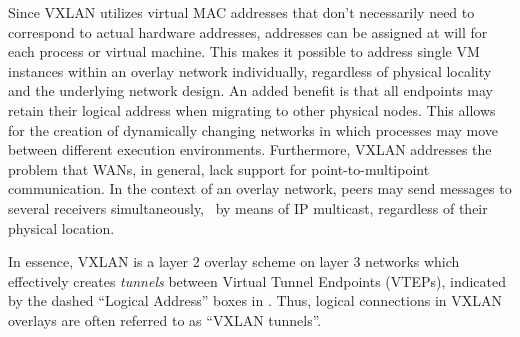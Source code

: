 Since VXLAN utilizes virtual MAC addresses that don't necessarily need to correspond to actual hardware addresses, addresses can be assigned at will for each process or virtual machine. This makes it possible to address single VM instances within an overlay network individually, regardless of physical locality and the underlying network design. An added benefit is that all endpoints may retain their logical address when migrating to other physical nodes. This allows for the creation of dynamically changing networks in which processes may move between different execution environments. Furthermore, VXLAN addresses the problem that WANs, in general, lack support for point-to-multipoint communication. In the context of an overlay network, peers may send messages to several receivers simultaneously, \eg\ by means of IP multicast, regardless of their physical location.

In essence, VXLAN is a layer 2 overlay scheme on layer 3 networks which effectively creates \emph{tunnels} between Virtual Tunnel Endpoints (VTEPs), indicated by the dashed ``Logical Address'' boxes in . Thus, logical connections in VXLAN overlays are often referred to as ``VXLAN tunnels''.












